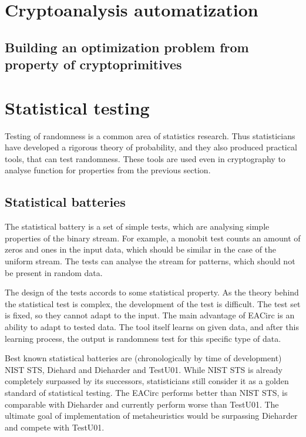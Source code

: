 \documentclass[
  print, %
  Table,   %
  nolof,     %
  nolot,     %
  draft, %
  11pt, %
  oneside  %
]{fithesis3}
\begin{document}
\section{Cryptoanalysis automatization}



\subsection[Optimization problem for a cryptoprimitive]{Building an optimization problem from property of cryptoprimitives}


\section{Statistical testing}

Testing of randomness is a common area of statistics research. Thus statisticians have developed a rigorous theory of probability, and they also produced practical tools, that can test randomness. These tools are used even in cryptography to analyse function for properties from the previous section.

\subsection{Statistical batteries}

The statistical battery is a set of simple tests, which are analysing simple properties of the binary stream. For example, a monobit test counts an amount of zeros and ones in the input data, which should be similar in the case of the uniform stream. The tests can analyse the stream for patterns, which should not be present in random data.

The design of the tests accords to some statistical property. As the theory behind the statistical test is complex, the development of the test is difficult. The test set is fixed, so they cannot adapt to the input. The main advantage of EACirc is an ability to adapt to tested data. The tool itself learns on given data, and after this learning process, the output is randomness test for this specific type of data.

Best known statistical batteries are (chronologically by time of development) NIST STS, Diehard and Dieharder and TestU01. While NIST STS is already completely surpassed by its successors, statisticians still consider it as a golden standard of statistical testing. The EACirc performs better than NIST STS, is comparable with Dieharder and currently perform worse than TestU01. The ultimate goal of implementation of metaheuristics would be surpassing Dieharder and compete with TestU01.
\end{document}
